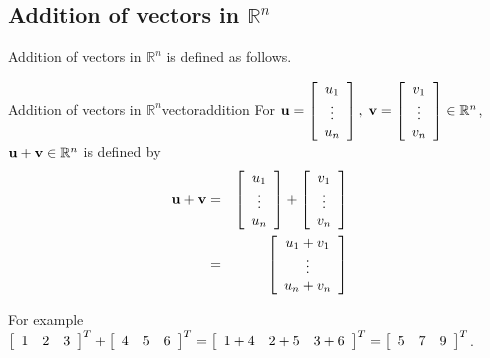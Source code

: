 \subsection{Addition of vectors in \texorpdfstring{$\mathbb{R}^n$}{Rn}}

Addition of vectors in $\mathbb{R}^n$ is defined as follows.

\begin{definition}{Addition of vectors in $\mathbb{R}^n$}{vectoraddition}
For ${\bf u}=\left[ \begin{array}{c}
u_{1} \\
\vdots \\
u_{n}
\end{array}
\right],\; {\bf v}= \left[ \begin{array}{c}
v_{1} \\
\vdots \\
v_{n}
\end{array}
\right] \in \mathbb{R}^{n}$,
 ${\bf u}+{\bf v}\in \mathbb{R}^{n}$ is defined by
\begin{eqnarray*}
{\bf u}+{\bf v} &=& \left[ \begin{array}{c}
u_{1} \\
\vdots \\
u_{n}
\end{array}
\right] +  \left[ \begin{array}{c}
v_{1} \\
\vdots \\
v_{n}
\end{array} \right]\\
& =& \left[ \begin{array}{c}
u_{1}+v_{1} \\
\vdots \\
u_{n}+v_{n}
\end{array}
\right]
\end{eqnarray*}
\end{definition}

For example 
$\left[
\begin{array}{rrr}
1 & 2 & 3
\end{array}
\right]^T +
\left[
\begin{array}{rrr}
4 & 5 & 6
\end{array}
\right]^T
=
\left[
\begin{array}{rrr}
1+4 & 2+5 & 3+6
\end{array}
\right]^T
=
\left[
\begin{array}{rrr}
5 & 7 & 9
\end{array}
\right]^T$.


